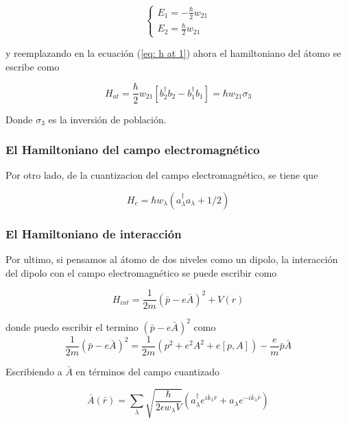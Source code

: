 \[ \begin{cases}
	E_1=-\frac{\hbar}{2}w_{21}\\
	E_2=\frac{\hbar}{2}w_{21}
\end{cases}
\]

y reemplazando en la ecuación (\ref{eq: h at 1}) ahora el hamiltoniano del átomo se escribe como 

\begin{equation}
	H_{at}=\frac{\hbar}{2}w_{21} [b^{\dagger}_2b_2-b^{\dagger}_1b_1]=\hbar w_{21} \sigma_3
	\label{eq: h at final}
\end{equation}

Donde $\sigma_3$ es la inversión de población.


\subsubsection{El Hamiltoniano del campo electromagnético}

Por otro lado, de la cuantizacion del campo electromagnético, se tiene que 

\begin{equation}
	H_c=\hbar w_{\lambda}(a^{\dagger}_{\lambda}a_{\lambda}+1/2)
	\label{eq: h electro}
\end{equation}


\subsubsection{El Hamiltoniano de interacción}

Por ultimo, si pensamos al átomo de dos niveles como un  dipolo, la interacción del dipolo con el campo electromagnético se puede escribir como 

\begin{equation}
	H_{int}=\frac{1}{2m}(\bar{p}-e\bar{A})^2+V(r)
	\label{eq: h int 1}
\end{equation}


donde puedo escribir el termino $(\bar{p}-e\bar{A})^2$ como 
\[\frac{1}{2m}(\bar{p}-e\bar{A})^2=\frac{1}{2m}(p^2+e^2A^2+e[p,A])-\frac{e}{m}\bar{p}\bar{A}
\]

Escribiendo a $\bar{A}$ en términos del campo cuantizado

\begin{equation}
\bar{A}(\bar{r})=\sum_{\lambda}\sqrt{\frac{\hbar}{2\epsilon w_{\lambda}V}} (a^{\dagger}_{\lambda}e^{i\bar{k}_{\lambda}\bar{r}}+a_{\lambda}e^{-i\bar{k}_{\lambda}\bar{r}})
\end{equation}


